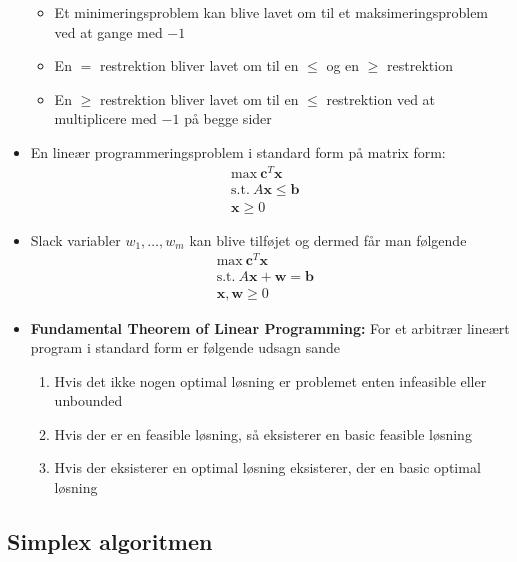 \begin{itemize}
\begin{itemize}
    \item Et minimeringsproblem kan blive lavet om til et maksimeringsproblem ved at gange med $-1$
  	\item En $=$ restrektion bliver lavet om til en $\leq$ og en $\geq$ restrektion 
    \item En $\geq$ restrektion bliver lavet om til en $\leq$ restrektion ved at multiplicere med $-1$ på begge sider
  \end{itemize} 
  \item En lineær programmeringsproblem i standard form på matrix form:
  \begin{align*}
    \text{max} \ \bm c^T \bm x & \\
    \text{s.t.} \ A \bm x \leq \bm b \\
      \bm{x} \geq 0 
  \end{align*}
  \item Slack variabler $w_1, \dots, w_m$ kan blive tilføjet og dermed får man følgende
  \begin{align*}
    \text{max} \ \bm c^T \bm x & \\
    \text{s.t.} \ A \bm x + \bm w = \bm b\\
      \bm{x}, \bm w \geq 0 
  \end{align*}
  \item \textbf{Fundamental Theorem of Linear Programming:} For et arbitrær lineært program i standard form er følgende udsagn sande
  \begin{enumerate}
  	\item Hvis det ikke nogen optimal løsning er problemet enten infeasible eller unbounded 
    \item Hvis der er en feasible løsning, så eksisterer en basic feasible løsning
    \item Hvis der eksisterer en optimal løsning eksisterer, der en basic optimal løsning
  \end{enumerate}  
\end{itemize}

\subsection{Simplex algoritmen}
